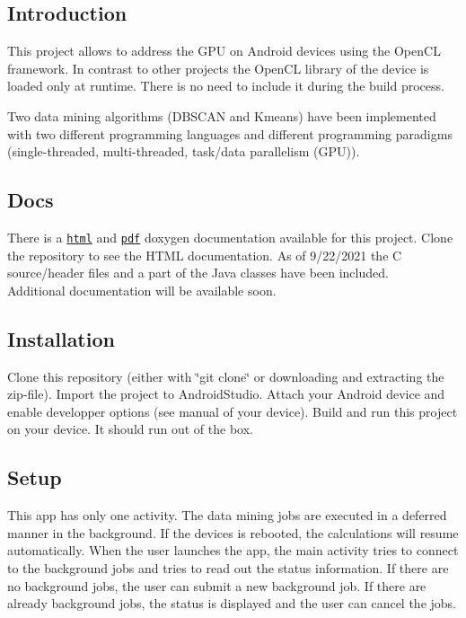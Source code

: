\subsection*{Introduction}

This project allows to address the G\+PU on Android devices using the Open\+CL framework. In contrast to other projects the Open\+CL library of the device is loaded only at runtime. There is no need to include it during the build process.

Two data mining algorithms (D\+B\+S\+C\+AN and Kmeans) have been implemented with two different programming languages and different programming paradigms (single-\/threaded, multi-\/threaded, task/data parallelism (G\+PU)).

\subsection*{Docs}

There is a \href{app/doc/html/index.html}{\tt html} and \href{app/doc/latex/refman.pdf}{\tt pdf} doxygen documentation available for this project. Clone the repository to see the H\+T\+ML documentation. As of 9/22/2021 the C source/header files and a part of the Java classes have been included. ~\newline
Additional documentation will be available soon.

\subsection*{Installation}

Clone this repository (either with \char`\"{}git clone\char`\"{} or downloading and extracting the zip-\/file). Import the project to Android\+Studio. Attach your Android device and enable developper options (see manual of your device). Build and run this project on your device. It should run out of the box.

\subsection*{Setup}

This app has only one activity. The data mining jobs are executed in a deferred manner in the background. If the devices is rebooted, the calculations will resume automatically. When the user launches the app, the main activity tries to connect to the background jobs and tries to read out the status information. If there are no background jobs, the user can submit a new background job. If there are already background jobs, the status is displayed and the user can cancel the jobs.

